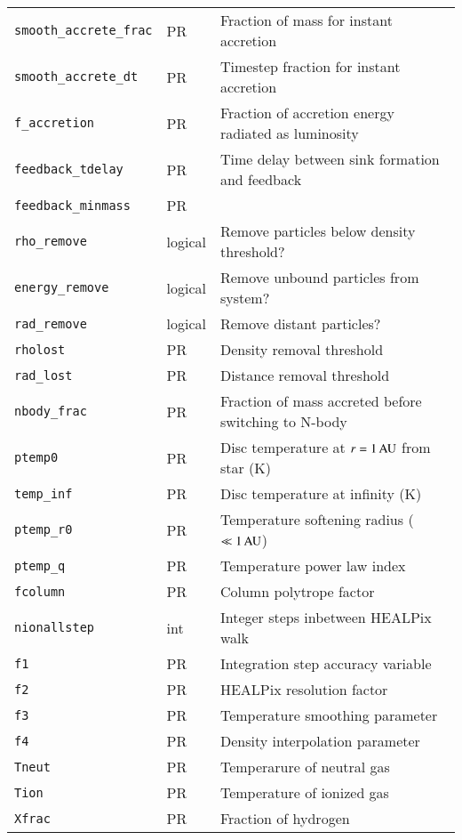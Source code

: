 \documentclass[a4paper]{article}
\newcommand{\var}[1]{\texttt{#1}}
\begin{document}
\begin{center}
\begin{supertabular}{|p{3cm}|p{2cm}|p{8cm}|}
\var{smooth\_accrete\_frac} & PR & Fraction of mass for instant accretion \\
\var{smooth\_accrete\_dt}   & PR & Timestep fraction for instant accretion \\
\var{f\_accretion}    & PR      & Fraction of accretion energy radiated as luminosity \\
\var{feedback\_tdelay} & PR     & Time delay between sink formation and feedback\\
\var{feedback\_minmass} & PR    & \\ \hline
\var{rho\_remove}    & logical  & Remove particles below density threshold? \\
\var{energy\_remove} & logical  & Remove unbound particles from system? \\
\var{rad\_remove}    & logical  & Remove distant particles? \\
\var{rholost}        & PR       & Density removal threshold \\
\var{rad\_lost}      & PR       & Distance removal threshold \\ \hline
\var{nbody\_frac}    & PR       & Fraction of mass accreted before switching to N-body \\ \hline
\var{ptemp0}         & PR       & Disc temperature at $r = 1\,{\rm AU}$ from star (K) \\
\var{temp\_inf}      & PR       & Disc temperature at infinity (K) \\
\var{ptemp\_r0}      & PR       & Temperature softening radius ($\ll 1\,{\rm AU}$) \\
\var{ptemp\_q}       & PR       & Temperature power law index \\
\var{fcolumn}        & PR       & Column polytrope factor \\ \hline
\var{nionallstep}    & int      & Integer steps inbetween HEALPix walk \\
\var{f1}             & PR       & Integration step accuracy variable \\
\var{f2}             & PR       & HEALPix resolution factor \\
\var{f3}             & PR       & Temperature smoothing parameter \\
\var{f4}             & PR       & Density interpolation parameter \\
\var{Tneut}          & PR       & Temperarure of neutral gas \\
\var{Tion}           & PR       & Temperature of ionized gas \\
\var{Xfrac}          & PR       & Fraction of hydrogen \\

\end{supertabular}
\end{center}
\end{document}
